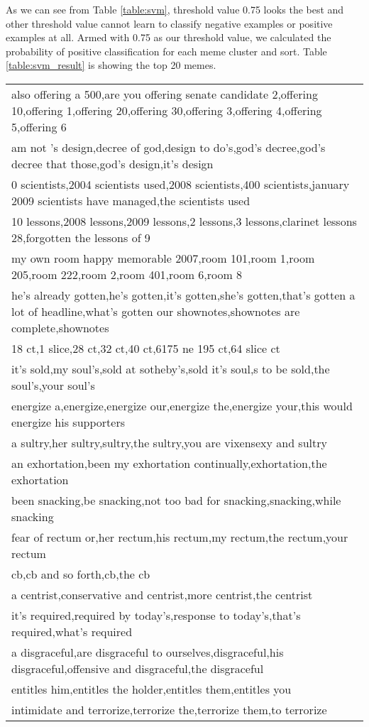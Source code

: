 \documentclass{sig-alternate}
\begin{document}
As we can see from Table \ref{table:svm}, threshold value 0.75 looks the best and other threshold value cannot learn to classify negative examples or positive examples at all. Armed with 0.75 as our threshold value, we calculated the probability of positive classification for each meme cluster and sort. Table \ref{table:svm_result} is showing the top 20 memes.

\begin{table*}[h!b!p!]
\begin{center}
\begin{tabular}{|p{15cm}|}
\hline
also offering a 500,are you offering senate candidate 2,offering 10,offering 1,offering 20,offering 30,offering 3,offering 4,offering 5,offering 6\\
am not 's design,decree of god,design to do's,god's decree,god's decree that those,god's design,it's design\\
0 scientists,2004 scientists used,2008 scientists,400 scientists,january 2009 scientists have managed,the scientists used\\
10 lessons,2008 lessons,2009 lessons,2 lessons,3 lessons,clarinet lessons 28,forgotten the lessons of 9\\
my own room happy memorable 2007,room 101,room 1,room 205,room 222,room 2,room 401,room 6,room 8\\
he's already gotten,he's gotten,it's gotten,she's gotten,that's gotten a lot of headline,what's gotten our shownotes,shownotes are complete,shownotes\\
18 ct,1 slice,28 ct,32 ct,40 ct,6175 ne 195 ct,64 slice ct\\
it's sold,my soul's,sold at sotheby's,sold it's soul,s to be sold,the soul's,your soul's\\
energize a,energize,energize our,energize the,energize your,this would energize his supporters\\
a sultry,her sultry,sultry,the sultry,you are vixensexy and sultry\\
an exhortation,been my exhortation continually,exhortation,the exhortation\\
been snacking,be snacking,not too bad for snacking,snacking,while snacking\\
fear of rectum or,her rectum,his rectum,my rectum,the rectum,your rectum\\
cb,cb and so forth,cb,the cb\\
a centrist,conservative and centrist,more centrist,the centrist\\
it's required,required by today's,response to today's,that's required,what's required\\
a disgraceful,are disgraceful to ourselves,disgraceful,his disgraceful,offensive and disgraceful,the disgraceful\\
entitles him,entitles the holder,entitles them,entitles you\\
intimidate and terrorize,terrorize the,terrorize them,to terrorize\\
\hline
\end{tabular}
\caption{Top 20 memes by classificatioin probability}
\label{table:svm_result}
\end{center}
\end{table*}
\end{document}
